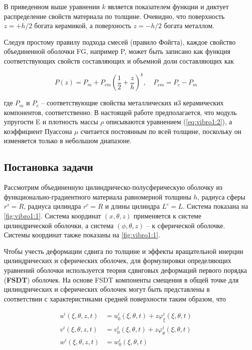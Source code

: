 В приведенном выше уравнении \(k\) является показателем функции и диктует распределение свойств материала по толщине. Очевидно, что поверхность \(z = +h/2\) богата керамикой, а поверхность \(z = -h/2\) богата металлом.


Следуя простому правилу подхода смесей (правило Фойгта), каждое свойство объединенной оболочки FG, например P, может быть записано как функция соответствующих свойств составляющих и объемной доли составляющих как

\begin{equation}
	\label{eq:vibro1:2}
	P(z) = P_m + P_{cm} \left (\frac{1}{2}+\frac{z}{h} \right )^{k} ,\quad  P_{cm} = P_c - P_m
\end{equation}

где \(P_m\) и \(P_c\) -- соответствующие свойства металлических и3 керамических компонентов, соответственно. В настоящей работе предполагается, что модуль упругости E и плотность массы \(\rho \) описываются уравнением (\cref{eq:vibro1:2}), а коэффициент Пуассона \(\mu \) считается постоянным по всей толщине, поскольку он изменяется только в небольшом диапазоне.


\subsection{Постановка задачи}\label{ch:ch3/sec2/sub3}

Рассмотрим объединенную цилиндрическо-полусферическую оболочку из функционально-градиентного материала равномерной толщины \(h\), радиуса сферы \(r^s = R\), радиуса цилиндра \(r^c = R\) и длины цилиндра \(L^c = L\). Система показана на \cref{fig:vibro1:1}. Система координат \((x, \theta, z)\) применяется к системе цилиндрической оболочки, а система \((\phi, \theta, z)\) -- к сферической оболочке. Системы координат также показаны на \cref{fig:vibro1:1}.

Чтобы учесть деформации сдвига по толщине и эффекты вращательной инерции цилиндрических и сферических оболочек, для формулировки определяющих уравнений оболочки используется теория сдвиговых деформаций первого порядка (\textbf{FSDT}) оболочек. На основе FSDT компоненты смещения в общей точке для цилиндрических и сферических оболочек могут быть представлены в соответствии с характеристиками средней поверхности таким образом, что

\begin{equation}
	\label{eq:vibro1:3}
	\begin{split}
	u^i (\xi, \theta, z, t) &= u_0^i(\xi, \theta, t)+ z \varphi_{\xi}^i (\xi, \theta,  t)\\
	v^i (\xi, \theta, z, t) &= v_0^i(\xi, \theta, t)+ z \varphi_{\theta}^i (\xi, \theta,  t)\\
	w^i (\xi, \theta, z, t) &= w_0^i (\xi, \theta, t)
	\end{split}
\end{equation}

